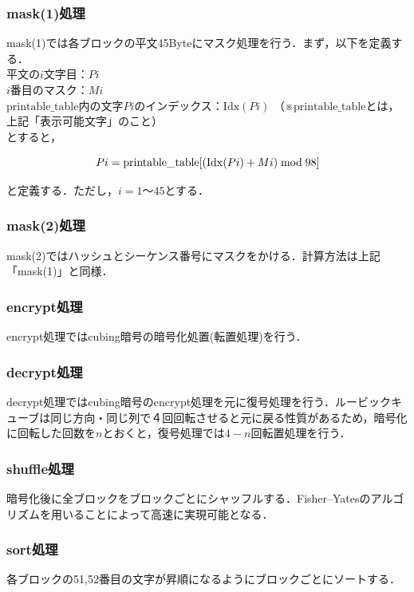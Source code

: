 \documentclass{jsarticle}
\begin{document}
\subsubsection{mask(1)処理}
mask(1)では各ブロックの平文45Byteにマスク処理を行う．まず，以下を定義する．\\
平文の\(i\)文字目：\(Pi\)\\
\(i\)番目のマスク：\(Mi\)\\
\(\mathrm{printable\_table}\)内の文字\(Pi\)のインデックス：\(\mathrm{Idx}(Pi)\) （※\(\mathrm{printable\_table}\)とは，上記「表示可能文字」のこと）\\
とすると，


\[Pi=\mathrm{printable\_table}[(\mathrm{Idx}(Pi)+Mi) \bmod 98]\\\]


と定義する．ただし，\(i=1〜45\)とする．

\subsubsection{mask(2)処理}
mask(2)ではハッシュとシーケンス番号にマスクをかける．計算方法は上記「mask(1)」と同様．

\subsubsection{encrypt処理}
encrypt処理ではcubing暗号の暗号化処置(転置処理)を行う．

\subsubsection{decrypt処理}
decrypt処理ではcubing暗号のencrypt処理を元に復号処理を行う．ルービックキューブは同じ方向・同じ列で４回回転させると元に戻る性質があるため，暗号化に回転した回数を\(n\)とおくと，復号処理では\(4-n\)回転置処理を行う．

\subsubsection{shuffle処理}
暗号化後に全ブロックをブロックごとにシャッフルする．Fisher–Yatesのアルゴリズムを用いることによって高速に実現可能となる．

\subsubsection{sort処理}
各ブロックの51,52番目の文字が昇順になるようにブロックごとにソートする．
\end{document}

